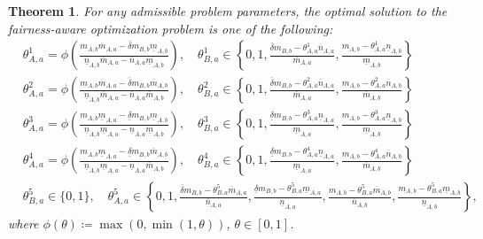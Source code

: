 \documentclass[letterpaper]{article} %
\newtheorem{theorem}{Theorem}
\begin{document}
\begin{theorem} \label{thm:constrained_soln}
For any admissible problem parameters, the optimal solution to the fairness-aware optimization problem is one of the following:
\begin{align*}
    &\theta_{A,a}^1 = \phi\left( \frac{m_{A,b}\overline{m}_{A,a} - \overline{\delta}m_{B,b}\underline{m}_{A,b}}
    {\underline{n}_{A,b}\overline{m}_{A,a} - \overline{n}_{A,a}\underline{m}_{A,b}} \right), \quad
    \theta_{B,a}^1 \in \left\{0, 1, \frac{\overline{\delta} m_{B,b} - \theta_{A,a}^1\overline{n}_{A,a}}{\overline{m}_{A,a}}, \frac{m_{A,b} - \theta_{A,a}^1\underline{n}_{A,b}}{\underline{m}_{A,b}}\right\} \\
    &\theta_{A,a}^2 = \phi\left( \frac{m_{A,b}\overline{m}_{A,a} - \overline{\delta}m_{B,b}\overline{m}_{A,b}}
    {\underline{n}_{A,b}\overline{m}_{A,a} - \overline{n}_{A,a}\overline{m}_{A,b}}\right), \quad
    \theta_{B,a}^2 \in \left\{0, 1, \frac{\overline{\delta} m_{B,b} - \theta_{A,a}^2\overline{n}_{A,a}}{\overline{m}_{A,a}}, \frac{m_{A,b} - \theta_{A,a}^2 \overline{n}_{A,b}}{\overline{m}_{A,b}}\right\} \\
    &\theta_{A,a}^3 = \phi\left( \frac{m_{A,b}\underline{m}_{A,a} - \underline{\delta}m_{B,b}\underline{m}_{A,b}}
    {\underline{n}_{A,b}\underline{m}_{A,a} - \underline{n}_{A,a}\underline{m}_{A,b}}\right), \quad
    \theta_{B,a}^3 \in \left\{0, 1, \frac{\underline{\delta}m_{B,b} - \theta_{A,a}^3 \underline{n}_{A,a}}{\underline{m}_{A,a}} , \frac{m_{A,b} - \theta_{A,a}^3\underline{n}_{A,b}}{\underline{m}_{A,b}}\right\}\\
    &\theta_{A,a}^4 = \phi\left( \frac{m_{A,b}\underline{m}_{A,a} - \underline{\delta}m_{B,b}\overline{m}_{A,b}}
    {\underline{n}_{A,b}\underline{m}_{A,a} - \underline{n}_{A,a}\overline{m}_{A,b}} \right), \quad
    \theta_{B,a}^4 \in \left\{0, 1, \frac{\underline{\delta}m_{B,b} - \theta_{A,a}^4 \underline{n}_{A,a}}{\underline{m}_{A,a}} , \frac{m_{A,b} - \theta_{A,a}^4 \overline{n}_{A,b}}{\overline{m}_{A,b}}\right\} \\
    &\theta_{B,a}^5 \in \{0,1\}, \quad
    \theta_{A,a}^5 \in \left\{0, 1, \frac{\overline{\delta}m_{B,b} - \theta_{B,a}^5 \overline{m}_{A,a}}{\overline{n}_{A,a}}, \frac{\underline{\delta}m_{B,b} - \theta_{B,a}^5 \underline{m}_{A,a}}{\underline{n}_{A,a}}, \frac{m_{A,b} - \theta_{B,a}^5 \overline{m}_{A,b}}{\overline{n}_{A,b}}, \frac{m_{A,b} - \theta_{B,a}^5 \underline{m}_{A,b}}{\underline{n}_{A,b}}\right\},
\end{align*}
where $\phi(\theta) \coloneqq \max(0, \min( 1, \theta))$, $\theta \in [0,1]$.
\end{theorem}
\end{document}
